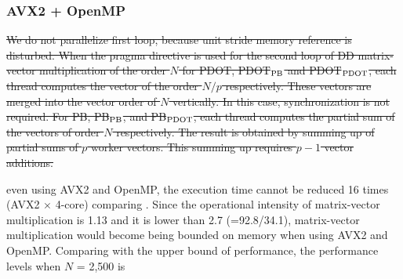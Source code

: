 \documentclass{IOS-Book-Article}
\begin{document}
{\subsubsection{AVX2 + OpenMP}
\sout{We do not parallelize first loop, because unit stride memory reference is disturbed. When the pragma directive is used for the second loop of DD matrix-vector multiplication of the order $N$ for PDOT, PDOT$_{\rm{PB}}$ and PDOT$_{\rm{PDOT}}$, each thread computes the vector of the order $N/p$ respectively. These vectors are merged into the vector order of $N$ vertically. In this case, synchronization is not required. For PB, PB$_{\rm{PB}}$, and PB$_{\rm{PDOT}}$, each thread computes the partial sum of the vectors of order $N$ respectively. The result is obtained by summing up of partial sums of $p$ worker vectors. This summing up requires $p-1$ vector additions.}

{}
{ even using AVX2 and OpenMP, the execution time cannot be reduced 16 times (AVX2 $\times$ 4-core) comparing {\color{mid}{to without parallelization}}. 
Since the operational intensity of matrix-vector multiplication is 1.13 and it is lower than 2.7 (=92.8/34.1), matrix-vector multiplication would become being bounded on memory when using AVX2 and OpenMP.
Comparing with the upper bound of performance, the performance levels when $N$ = 2,500 is {\color{mid}{67\% (25.63/(34.1*1.13)).}}}}

\end{document}
